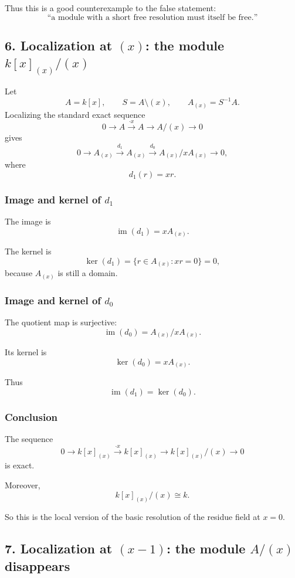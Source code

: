\documentclass[12pt,a4paper]{article}
\theoremstyle{notespace}
\theoremstyle{definition}
\begin{document}
Thus this is a good counterexample to the false statement:
\[
\text{``a module with a short free resolution must itself be free.''}
\]

\subsection{6. Localization at \((x)\): the module \(k[x]_{(x)}/(x)\)}

Let
\[
A=k[x], \qquad S=A\setminus (x), \qquad A_{(x)}=S^{-1}A.
\]
Localizing the standard exact sequence
\[
0 \longrightarrow A \xrightarrow{\cdot x} A \longrightarrow A/(x) \longrightarrow 0
\]
gives
\[
0 \longrightarrow A_{(x)} \xrightarrow{d_1} A_{(x)} \xrightarrow{d_0} A_{(x)}/xA_{(x)} \longrightarrow 0,
\]
where
\[
d_1(r)=xr.
\]

\subsubsection*{Image and kernel of \(d_1\)}

The image is
\[
\operatorname{im}(d_1)=xA_{(x)}.
\]

The kernel is
\[
\ker(d_1)=\{r\in A_{(x)} : xr=0\}=0,
\]
because \(A_{(x)}\) is still a domain.

\subsubsection*{Image and kernel of \(d_0\)}

The quotient map is surjective:
\[
\operatorname{im}(d_0)=A_{(x)}/xA_{(x)}.
\]

Its kernel is
\[
\ker(d_0)=xA_{(x)}.
\]

Thus
\[
\operatorname{im}(d_1)=\ker(d_0).
\]

\subsubsection*{Conclusion}

The sequence
\[
0 \longrightarrow k[x]_{(x)} \xrightarrow{\cdot x} k[x]_{(x)} \longrightarrow k[x]_{(x)}/(x) \longrightarrow 0
\]
is exact.

Moreover,
\[
k[x]_{(x)}/(x)\cong k.
\]

So this is the local version of the basic resolution of the residue field at \(x=0\).

\subsection{7. Localization at \((x-1)\): the module \(A/(x)\) disappears}
\end{document}
